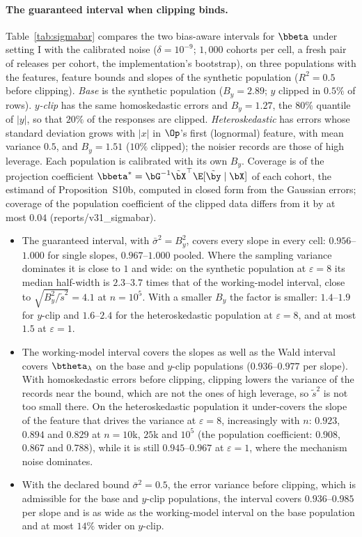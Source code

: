 \paragraph{The guaranteed interval when clipping binds.} Table~\ref{tab:sigmabar} compares the two bias-aware intervals for $\bbeta$ under setting I with the calibrated noise ($\delta = 10^{-9}$; $1{,}000$ cohorts per cell, a fresh pair of releases per cohort, the implementation's bootstrap), on three populations with the features, feature bounds and slopes of the synthetic population ($R^2 = 0.5$ before clipping). \emph{Base} is the synthetic population ($B_y = 2.89$; $y$ clipped in $0.5\%$ of rows). \emph{$y$-clip} has the same homoskedastic errors and $B_y = 1.27$, the $80\%$ quantile of $|y|$, so that $20\%$ of the responses are clipped. \emph{Heteroskedastic} has errors whose standard deviation grows with $|x|$ in $\Op$'s first (lognormal) feature, with mean variance $0.5$, and $B_y = 1.51$ ($10\%$ clipped); the noisier records are those of high leverage. Each population is calibrated with its own $B_y$. Coverage is of the projection coefficient $\bbeta^\ast = \bG^{-1}\tilde\bX^\top\E[\tilde\by \mid \bX]$ of each cohort, the estimand of Proposition~S10b, computed in closed form from the Gaussian errors; coverage of the population coefficient of the clipped data differs from it by at most $0.04$ (reports/v31\_sigmabar).
\begin{itemize}[noitemsep]
  \item The guaranteed interval, with $\bar\sigma^2 = B_y^2$, covers every slope in every cell: $0.956$--$1.000$ for single slopes, $0.967$--$1.000$ pooled. Where the sampling variance dominates it is close to $1$ and wide: on the synthetic population at $\varepsilon = 8$ its median half-width is $2.3$--$3.7$ times that of the working-model interval, close to $\sqrt{B_y^2/\tilde s^2} = 4.1$ at $n = 10^5$. With a smaller $B_y$ the factor is smaller: $1.4$--$1.9$ for $y$-clip and $1.6$--$2.4$ for the heteroskedastic population at $\varepsilon = 8$, and at most $1.5$ at $\varepsilon = 1$.
  \item The working-model interval covers the slopes as well as the Wald interval covers $\btheta_\lambda$ on the base and $y$-clip populations ($0.936$--$0.977$ per slope). With homoskedastic errors before clipping, clipping lowers the variance of the records near the bound, which are not the ones of high leverage, so $\tilde s^2$ is not too small there. On the heteroskedastic population it under-covers the slope of the feature that drives the variance at $\varepsilon = 8$, increasingly with $n$: $0.923$, $0.894$ and $0.829$ at $n = 10$k, $25$k and $10^5$ (the population coefficient: $0.908$, $0.867$ and $0.788$), while it is still $0.945$--$0.967$ at $\varepsilon = 1$, where the mechanism noise dominates.
  \item With the declared bound $\bar\sigma^2 = 0.5$, the error variance before clipping, which is admissible for the base and $y$-clip populations, the interval covers $0.936$--$0.985$ per slope and is as wide as the working-model interval on the base population and at most $14\%$ wider on $y$-clip.
\end{itemize}
